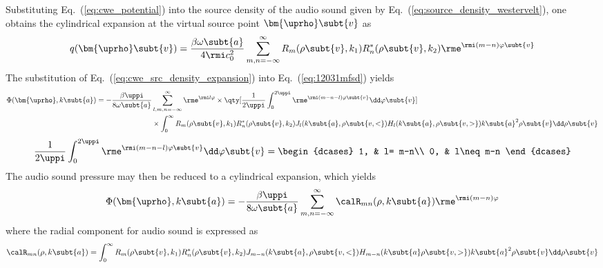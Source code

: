 Substituting Eq.~(\ref{eq:cwe_potential}) into the source density of the audio sound given by Eq.~(\ref{eq:source_density_westervelt}), one obtains the cylindrical expansion at the virtual source point $\bm{\uprho}\subt{v}$ as
\begin{equation}
    q(\bm{\uprho}\subt{v}) = \frac{\beta\omega\subt{a}}{4\rmi c_0^2}
    \sum_{m,n=-\infty}^\infty
    R_m(\rho\subt{v},k_1)R_n^*(\rho\subt{v},k_2)
    \rme^{\rmi (m-n)\varphi\subt{v}}
    \label{eq:cwe_src_density_expansion}
\end{equation}
The substitution of Eq.~(\ref{eq:cwe_src_density_expansion}) into Eq.~(\ref{eq:12031mfsd}) yields
\begin{equation}
    \begin{split}
        \Phi(\bm{\uprho},k\subt{a})
        = 
        -\frac{\beta\uppi }{8 \omega\subt{a}}
        & \sum_{l,m,n=-\infty}^\infty
        \rme^{\rmi l \varphi}
        \times
        \qty[\frac{1}{2\uppi} \int_0^{2\uppi} \rme^{\rmi (m-n-l)\varphi\subt{v}}\dd \varphi\subt{v}]\\
        &\times 
        \int_0^\infty 
        R_m(\rho\subt{v},k_1)
        R_n^*(\rho\subt{v}, k_2)
        J_l(k\subt{a}, \rho\subt{v,<})
        H_l(k\subt{a}, \rho\subt{v,>})
        k\subt{a}^2 \rho\subt{v}
        \dd \rho\subt{v}
    \end{split}
    \label{eq:cwe_potential0}
\end{equation}
\begin{equation}
    \frac{1}{2\uppi} \int_0^{2\uppi}
    \rme^{\rmi(m-n-l)\varphi\subt{v}}\dd \varphi\subt{v}
    =
    \begin{dcases}
        1, & l= m-n\\
        0, & l\neq m-n
    \end{dcases}
\end{equation}
The audio sound pressure may then be reduced to a cylindrical expansion, which yields
\begin{equation}
    \Phi(\bm{\uprho},k\subt{a})
    =
    -\frac{\beta\uppi }{8\omega\subt{a} }
    \sum_{m,n=-\infty}^\infty
    \calR_{mn}(\rho,k\subt{a})
    \rme^{\rmi(m-n)\varphi}
    \label{eq:cwe_audio}
\end{equation}
where the radial component for audio sound is expressed as 
\begin{equation}
    \calR_{mn}(\rho,k\subt{a}) = \int_0^\infty R_m(\rho\subt{v},k_1)R_n^* (\rho\subt{v},k_2)
    J_{m-n}(k\subt{a},\rho\subt{v,<})H_{m-n}(k\subt{a}\rho\subt{v,>})
    k\subt{a}^2 \rho\subt{v}
    \dd \rho\subt{v}
    \label{eq:cwe_audio_radial_component}
\end{equation}

